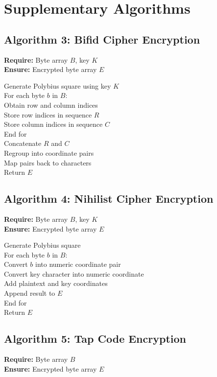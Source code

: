\section*{Supplementary Algorithms}

\subsection*{Algorithm 3: Bifid Cipher Encryption}
\textbf{Require:} Byte array $B$, key $K$ \\
\textbf{Ensure:} Encrypted byte array $E$

Generate Polybius square using key $K$ \\
For each byte $b$ in $B$: \\
\quad Obtain row and column indices \\
\quad Store row indices in sequence $R$ \\
\quad Store column indices in sequence $C$ \\
End for \\
Concatenate $R$ and $C$ \\
Regroup into coordinate pairs \\
Map pairs back to characters \\
Return $E$

\subsection*{Algorithm 4: Nihilist Cipher Encryption}
\textbf{Require:} Byte array $B$, key $K$ \\
\textbf{Ensure:} Encrypted byte array $E$

Generate Polybius square \\
For each byte $b$ in $B$: \\
\quad Convert $b$ into numeric coordinate pair \\
\quad Convert key character into numeric coordinate \\
\quad Add plaintext and key coordinates \\
\quad Append result to $E$ \\
End for \\
Return $E$

\subsection*{Algorithm 5: Tap Code Encryption}
\textbf{Require:} Byte array $B$ \\
\textbf{Ensure:} Encrypted byte array $E$

